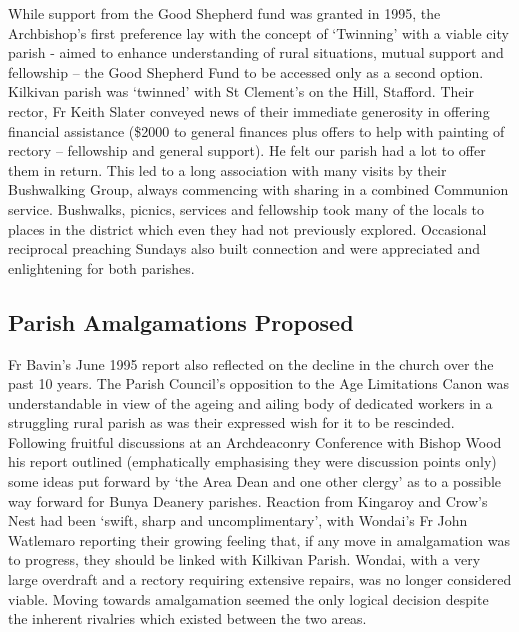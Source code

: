 While support from the Good Shepherd fund was granted in 1995, the Archbishop's first preference lay with the concept of `Twinning' with a viable city parish - aimed to enhance understanding of rural situations, mutual support and fellowship -- the Good Shepherd Fund to be accessed only as a second option. Kilkivan parish was `twinned' with St Clement's on the Hill, Stafford. Their rector, Fr Keith Slater conveyed news of their immediate generosity in offering financial assistance (\$2000 to general finances plus offers to help with painting of rectory -- fellowship and general support). He felt our parish had a lot to offer them in return. This led to a long association with many visits by their Bushwalking Group, always commencing with sharing in a combined Communion service. Bushwalks, picnics, services and fellowship took many of the locals to places in the district which even they had not previously explored. Occasional reciprocal preaching Sundays also built connection and were appreciated and enlightening for both parishes.



\subsection{Parish Amalgamations Proposed}



Fr Bavin's June 1995 report also reflected on the decline in the church over the past 10 years. The Parish Council's opposition to the Age Limitations Canon was understandable in view of the ageing and ailing body of dedicated workers in a struggling rural parish as was their expressed wish for it to be rescinded. Following fruitful discussions at an Archdeaconry Conference with Bishop Wood his report outlined (emphatically emphasising they were discussion points only) some ideas put forward by `the Area Dean and one other clergy' as to a possible way forward for Bunya Deanery parishes. Reaction from Kingaroy and Crow's Nest had been `swift, sharp and uncomplimentary', with Wondai's Fr John Watlemaro reporting their growing feeling that, if any move in amalgamation was to progress, they should be linked with Kilkivan Parish. Wondai, with a very large overdraft and a rectory requiring extensive repairs, was no longer considered viable. Moving towards amalgamation seemed the only logical decision despite the inherent rivalries which existed between the two areas.



